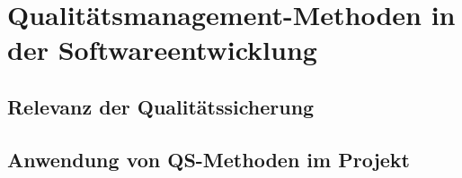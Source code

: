 \section{Qualitätsmanagement-Methoden in der Softwareentwicklung}\label{Qualitätsmanagement-Methoden in der Softwareentwicklung}

\subsection{Relevanz der Qualitätssicherung}


\subsection{Anwendung von QS-Methoden im Projekt}

